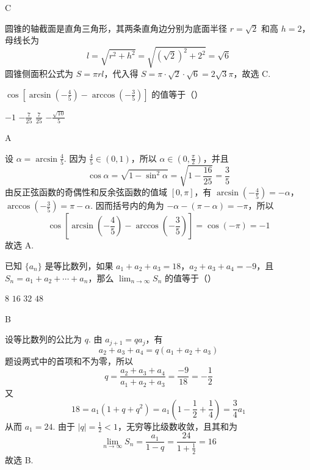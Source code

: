 \begin{answer}
C
\end{answer}

\begin{solution}
圆锥的轴截面是直角三角形，其两条直角边分别为底面半径 \(r=\sqrt{2}\) 和高 \(h=2\)，母线长为
\[
l=\sqrt{r^2+h^2}=\sqrt{(\sqrt{2})^2+2^2}=\sqrt{6}
\]
圆锥侧面积公式为 \(S=\pi r l\)，代入得 \(S=\pi\cdot\sqrt{2}\cdot\sqrt{6}=2\sqrt{3}\pi\)，故选 C.
\end{solution}

\begin{problem}
\(\cos \left[\arcsin \left(-\frac{4}{5}\right) - \arccos \left(-\frac{3}{5}\right)\right]\) 的值等于（\quad）

\choices
    {\(-1\)}
    {\(-\frac{7}{25}\)}
    {\(\frac{7}{25}\)}
    {\(-\frac{\sqrt{10}}{5}\)}
\end{problem}

\begin{answer}
A
\end{answer}

\begin{solution}
设 \(\alpha=\arcsin\frac45\). 因为 \(\frac{4}{5}\in(0,1)\)，所以 \(\alpha\in(0,\frac{\pi}{2})\)，并且
\[
\cos\alpha=\sqrt{1-\sin^2\alpha}=\sqrt{1-\frac{16}{25}}=\frac35
\]
由反正弦函数的奇偶性和反余弦函数的值域 \([0,\pi]\)，有 \(\arcsin(-\frac45)=-\alpha\)，\(\arccos(-\frac35)=\pi-\alpha\). 因而括号内的角为 \(-\alpha-(\pi-\alpha)=-\pi\)，所以
\[
\cos\left[\arcsin\left(-\frac45\right)-\arccos\left(-\frac35\right)\right]=\cos(-\pi)=-1
\]
故选 A.
\end{solution}

\begin{problem}
已知 \(\{a_n\}\) 是等比数列，如果 \(a_1 + a_2 + a_3 = 18\)，\(a_2 + a_3 + a_4 = -9\)，且 \(S_n = a_1 + a_2 + \cdots + a_n\)，那么 \(\displaystyle\lim_{n \to \infty} S_n\) 的值等于（\quad）

\choices
    {\(8\)}
    {\(16\)}
    {\(32\)}
    {\(48\)}
\end{problem}

\begin{answer}
B
\end{answer}

\begin{solution}
设等比数列的公比为 \(q\). 由 \(a_{j+1}=qa_j\)，有
\[
a_2+a_3+a_4=q(a_1+a_2+a_3)
\]
题设两式中的首项和不为零，所以
\[
q=\frac{a_2+a_3+a_4}{a_1+a_2+a_3}=\frac{-9}{18}=-\frac12
\]
又
\[
18=a_1(1+q+q^2)=a_1\left(1-\frac12+\frac14\right)=\frac34a_1
\]
从而 \(a_1=24\). 由于 \(|q|=\frac12<1\)，无穷等比级数收敛，且其和为
\[
\lim_{n\to\infty}S_n=\frac{a_1}{1-q}=\frac{24}{1+\frac12}=16
\]
故选 B.
\end{solution}


